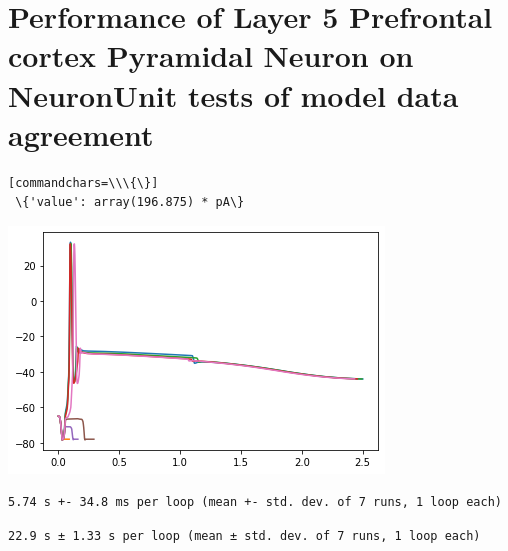 
    
\section{Performance of Layer 5 Prefrontal cortex Pyramidal Neuron on
NeuronUnit tests of model data
agreement}
    \begin{verbatim}[commandchars=\\\{\}]
 \{'value': array(196.875) * pA\}
    \end{verbatim}

    \begin{center}
    \includegraphics[width=0.7\linewidth]{figures/NU_BBP_fusion_L5PC_files/NU_BBP_fusion_L5PC_3_1.png}
    \end{center}

    \begin{verbatim}
5.74 s +- 34.8 ms per loop (mean +- std. dev. of 7 runs, 1 loop each)
    \end{verbatim}

    
    \begin{Verbatim}[commandchars=\\\{\}]
22.9 s ± 1.33 s per loop (mean ± std. dev. of 7 runs, 1 loop each)
    \end{Verbatim}

    \begin{center}
    \end{center}
    { \hspace*{\fill} \\}
    
